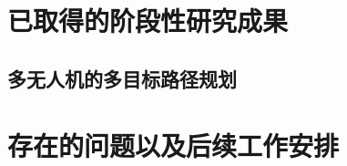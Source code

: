 \documentclass[UTF8,a4paper]{ctexart}
\begin{document}
\section{已取得的阶段性研究成果}
\subsection{多无人机的多目标路径规划}\label{sec:vrp}



















\section{存在的问题以及后续工作安排}















\newpage





















\end{document}
